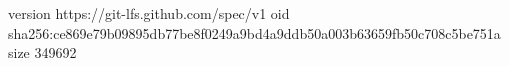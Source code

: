 version https://git-lfs.github.com/spec/v1
oid sha256:ce869e79b09895db77be8f0249a9bd4a9ddb50a003b63659fb50c708c5be751a
size 349692
